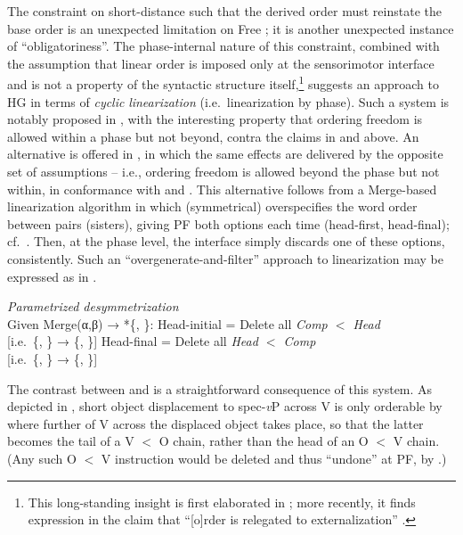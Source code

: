 \documentclass[output=paper]{langsci/langscibook}
\begin{document}
The constraint on short-distance  such that the derived order must
reinstate the base order is an unexpected limitation on Free ; it is
another unexpected instance of \enquote{obligatoriness}. The phase-internal nature of
this constraint, combined with the assumption that linear order is imposed only
at the sensorimotor interface and is not a property of the syntactic structure
itself,\footnote{This long-standing insight is first elaborated in
    \textcite[334--340]{Chomsky1995}; more recently, it finds expression in the
    claim that \enquote{[o]rder is relegated to externalization}
\citep[4]{Chomsky2015}.} suggests an approach to \gls{HG} in terms of \emph{cyclic}
\emph{linearization} (i.e.\ linearization by phase). Such a system is notably
proposed in \citet{FoxPes2005}, with the interesting property that
ordering freedom is allowed within a phase but not beyond, contra the claims in
 and  above. An alternative is offered in
\textcite{Richards2004,Richards2007b}, in which the same effects are delivered
by the opposite set of assumptions -- i.e., ordering freedom is allowed beyond
the phase but not within, in conformance with  and
. This alternative follows from a Merge-based linearization
algorithm in which (symmetrical)  overspecifies the word order
between  pairs (sisters), giving \gls{PF} both options each time
(head-first, head-final); cf.\ \citealt{EpsGroKawKit1998}.  Then, at the
phase level, the interface simply discards one of these options,
consistently. Such an \enquote{overgenerate-and-filter} approach to
linearization may be expressed as in .

\ea\label{ex:key:22.7}\emph{Parametrized desymmetrization}\\
    Given Merge(α,β) → *\{, \}:
    \ea\label{ex:key:22.7a} Head-initial = Delete all \emph{Comp $<$ Head}\\
    {}[i.e.\ \{, \} → \{, \sout{}\}]
    \ex\label{ex:key:22.7b} Head-final = Delete all \emph{Head $<$ Comp}\\
    {}[i.e.\ \{, \} → \{\sout{}, \}]
    \z
\z

The contrast between  and  is a
straightforward consequence of this system. As depicted in ,
short object displacement to spec-\emph{v}P across V is only orderable by
 where further  of V across the displaced object
takes place, so that the latter becomes the tail of a V $<$ O chain, rather
than the head of an O $<$ V chain. (Any such O $<$ V instruction would be
deleted and thus \enquote{undone} at \gls{PF}, by
.)\newpage
\end{document}
